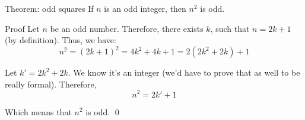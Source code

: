 \documentclass{article}
\begin{document}
\begin{parag}{Theorem: odd squares}
    If $n$ is an odd integer, then $n^2$ is odd.

    \begin{subparag}{Proof}
        Let $n$ be an odd number. Therefore, there exists $k$, such that $n = 2k + 1$ (by definition). Thus, we have:
        \[n^{2} = \left(2k + 1\right)^2 = 4k^2 + 4k + 1 = 2\left(2k^2 + 2k\right) + 1\]

        Let $k' = 2k^2 + 2k$. We know it's an integer (we'd have to prove that as well to be really formal). Therefore,
        \[n^2 = 2k' + 1\]

        Which means that $n^2$ is odd.
        \qed
    \end{subparag}

\end{parag}
\end{document}
